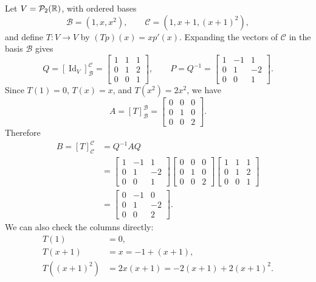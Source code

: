 \begin{example}
  Let $V=\mathcal P_2(\mathbb{R})$, with ordered bases
  \[
    \mathcal B=(1,x,x^2),\qquad
    \mathcal C=(1,x+1,(x+1)^2),
  \]
  and define $T\colon V\to V$ by $(Tp)(x)=xp'(x)$.
  Expanding the vectors of $\mathcal C$ in the basis $\mathcal B$ gives
  \[
    Q=[\operatorname{Id}_V]_{\mathcal B}^{\mathcal C}
      =\begin{bmatrix}1&1&1\\0&1&2\\0&0&1\end{bmatrix},
    \qquad
    P=Q^{-1}
      =\begin{bmatrix}1&-1&1\\0&1&-2\\0&0&1\end{bmatrix}.
  \]
  Since $T(1)=0$, $T(x)=x$, and $T(x^2)=2x^2$, we have
  \[
    A=[T]_{\mathcal B}^{\mathcal B}
      =\begin{bmatrix}0&0&0\\0&1&0\\0&0&2\end{bmatrix}.
  \]
  Therefore
  \begin{align*}
    B=[T]_{\mathcal C}^{\mathcal C}
      &=Q^{-1}AQ\\
      &=\begin{bmatrix}1&-1&1\\0&1&-2\\0&0&1\end{bmatrix}
        \begin{bmatrix}0&0&0\\0&1&0\\0&0&2\end{bmatrix}
        \begin{bmatrix}1&1&1\\0&1&2\\0&0&1\end{bmatrix}\\
      &=\begin{bmatrix}0&-1&0\\0&1&-2\\0&0&2\end{bmatrix}.
  \end{align*}
  We can also check the columns directly:
  \begin{align*}
    T(1)&=0,\\
    T(x+1)&=x=-1+(x+1),\\
    T((x+1)^2)&=2x(x+1)=-2(x+1)+2(x+1)^2.
  \end{align*}
\end{example}


